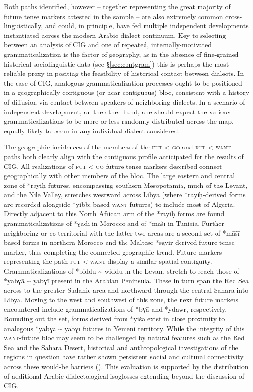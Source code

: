 \documentclass[output=paper]{langsci/langscibook}
\begin{document}
Both paths identified, however – together representing the great majority of future tense markers attested in the sample – are also extremely common cross-linguistically, and could, in principle, have fed multiple independent developments instantiated across the modern Arabic dialect continuum. Key to selecting between an analysis of CIG and one of repeated, internally-motivated grammaticalization is the factor of geography, as in the absence of fine-grained historical sociolinguistic data (see §\ref{sec:contgram}) this is perhaps the most reliable proxy in positing the feasibility of historical contact between dialects. In the case of CIG, analogous grammaticalization processes ought to be positioned in a geographically contiguous (or near contiguous) bloc, consistent with a history of diffusion via contact between speakers of neighboring dialects. In a scenario of independent development, on the other hand, one should expect the various grammaticalizations to be more or less randomly distributed across the map, equally likely to occur in any individual dialect considered.

The geographic incidences of the members of the \textsc{fut} < \textsc{go} and \textsc{fut} < \textsc{want} paths both clearly align with the contiguous profile anticipated for the results of CIG. All realizations of \textsc{fut} < \textsc{go} future tense markers described connect geographically with other members of the bloc. The large eastern and central zone of *rāyiḥ futures, encompassing southern Mesopotamia, much of the Levant, and the Nile Valley, stretches westward across Libya (where *rāyiḥ{}-derived forms are recorded alongside *yibbī-based \textsc{want}{}-futures) to include most of Algeria. Directly adjacent to this North African arm of the *rāyiḥ forms are found grammaticalizations of *ɣādī in Morocco and of *māšī in Tunisia. Further neighboring or co-territorial with the latter two areas are a second set of *māšī{}-based forms in northern Morocco and the Maltese *sāyir-derived future tense marker, thus completing the connected geographic trend. Future markers representing the path \textsc{fut} < \textsc{want} display a similar spatial contiguity. Grammaticalizations of *biddu {\textasciitilde} widdu in the Levant stretch to reach those of *yabɣā {\textasciitilde} yabɣī present in the Arabian Peninsula. These in turn span the Red Sea across to the greater Sudanic area and northward through the central Sahara into Libya. Moving to the west and southwest of this zone, the next future markers encountered include grammaticalizations of *bɣā and *ydawr, respectively. Rounding out the set, forms derived from *yišā exist in close proximity to analogous *yabɣā {\textasciitilde} yabɣī futures in Yemeni territory. While the integrity of this \textsc{want}{}-future bloc may seem to be challenged by natural features such as the Red Sea and the Sahara Desert, historical and anthropological investigations of the regions in question have rather shown persistent social and cultural connectivity across these would-be barriers (\citealt{Lydon2009,Power2012}). This evaluation is supported by the distribution of additional Arabic dialectological isoglosses extending beyond the discussion of CIG.
\end{document}
